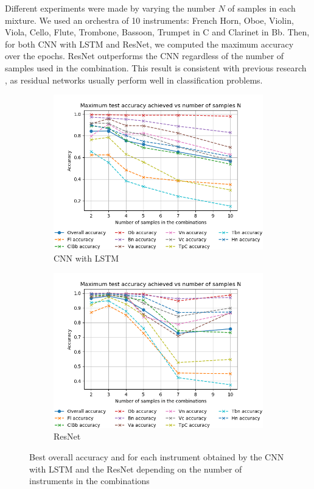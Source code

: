 \documentclass[runningheads,a4paper]{llncs}
\begin{document}
Different experiments were made by varying the number $N$ of samples in each mixture. We used an orchestra of 10 instruments: French Horn, Oboe, Violin, Viola, Cello, Flute, Trombone, Bassoon, Trumpet in C and Clarinet in Bb. Then, for both CNN with LSTM and ResNet, we computed the maximum accuracy over the epochs. 
ResNet outperforms the CNN regardless of the number of samples used in the combination. This result is consistent with previous research \cite{He15}, as residual networks usually perform well in classification problems.


\begin{figure}
  \centering
  \begin{subfigure}{.52\textwidth}
    \centering
    \includegraphics[width=0.9\linewidth]{../latex/figs/Acc_vs_N_CNN.png}
    \caption{CNN with LSTM}
    \label{best_acc_cnn}
  \end{subfigure}%
  \begin{subfigure}{.52\textwidth}
    \centering
    \includegraphics[width=0.9\linewidth]{../latex/figs/Acc_vs_N_ResNet.png}
    \caption{ResNet}
    \label{best_acc_resnet}
  \end{subfigure}
  \caption{Best overall accuracy and for each instrument obtained by the CNN with LSTM and the ResNet depending on the number of instruments in the combinations}
  \end{figure}
\end{document}
